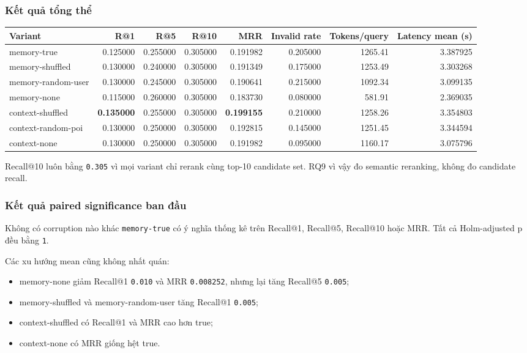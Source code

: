 \subsubsection*{Kết quả tổng thể}

\begin{table}[!htbp]
\centering
\scriptsize
\setlength{\tabcolsep}{2.5pt}
\begin{adjustbox}{max width=\textwidth}
\begin{tabular}{@{}lrrrrrrr@{}}
\toprule
Variant & R@1 & R@5 & R@10 & MRR & Invalid rate & Tokens/query & Latency mean (s) \\
\midrule
memory-true & 0.125000 & 0.255000 & 0.305000 & 0.191982 & 0.205000 & 1265.41 & 3.387925 \\
memory-shuffled & 0.130000 & 0.240000 & 0.305000 & 0.191349 & 0.175000 & 1253.49 & 3.303268 \\
memory-random-user & 0.130000 & 0.245000 & 0.305000 & 0.190641 & 0.215000 & 1092.34 & 3.099135 \\
memory-none & 0.115000 & 0.260000 & 0.305000 & 0.183730 & 0.080000 & 581.91 & 2.369035 \\
context-shuffled & \textbf{0.135000} & 0.255000 & 0.305000 & \textbf{0.199155} & 0.210000 & 1258.26 & 3.354803 \\
context-random-poi & 0.130000 & 0.250000 & 0.305000 & 0.192815 & 0.145000 & 1251.45 & 3.344594 \\
context-none & 0.130000 & 0.250000 & 0.305000 & 0.191982 & 0.095000 & 1160.17 & 3.075796 \\
\bottomrule
\end{tabular}
\end{adjustbox}
\end{table}

Recall@10 luôn bằng \texttt{0.305} vì mọi variant chỉ rerank cùng top-10 candidate set. RQ9 vì vậy đo semantic reranking, không đo candidate recall.

\subsubsection*{Kết quả paired significance ban đầu}

Không có corruption nào khác \texttt{memory-true} có ý nghĩa thống kê trên Recall@1, Recall@5, Recall@10 hoặc MRR. Tất cả Holm-adjusted p đều bằng \texttt{1}.

Các xu hướng mean cũng không nhất quán:

\begin{itemize}
\item memory-none giảm Recall@1 \texttt{0.010} và MRR \texttt{0.008252}, nhưng lại tăng Recall@5
\texttt{0.005};

\item memory-shuffled và memory-random-user tăng Recall@1 \texttt{0.005};
\item context-shuffled có Recall@1 và MRR cao hơn true;
\item context-none có MRR giống hệt true.
\end{itemize}

